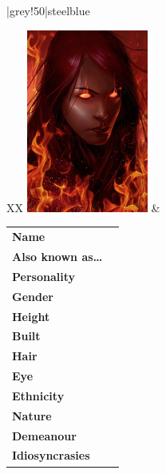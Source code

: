 \begin{table}
    \begin{framed}
        \centering
        \taburulecolor |grey!50|{steelblue} \arrayrulewidth=1pt
        \begin{tabu}{X[1]X[2]}
            \parbox[t]{1em}{\vspace{0pt}\includegraphics[width=4cm]{images/portrait}} &
            \begin{tabu}{XX[2]}
                \toprule
                \textbf{Name}                & \textbf{\Large{}} \\
                \textbf{Also known as\ldots} &                                       \\
                \textbf{Personality}         &                                       \\
                \midrule
                \textbf{Gender}              &                                       \\
                \textbf{Height}              &                                       \\
                \textbf{Built}               &                                       \\
                \midrule
                \textbf{Hair}                &                                       \\
                \textbf{Eye}                 &                                       \\
                \textbf{Ethnicity}           &                                       \\
                \midrule
                \textbf{Nature}              &                                       \\
                \textbf{Demeanour}           &                                       \\
                \textbf{Idiosyncrasies}      &                                       \\

\end{tabu}
\end{tabu}
\end{framed}
\end{table}
